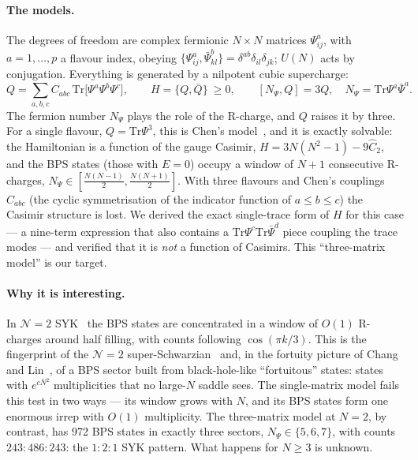 \documentclass[10pt]{article}
\newcommand{\Tr}{\mathrm{Tr}}
\newcommand{\bPsi}{\bar\Psi}
\newcommand{\bQ}{\bar Q}
\begin{document}
\paragraph{The models.}
The degrees of freedom are complex fermionic $N\times N$ matrices $\Psi^a_{ij}$, with $a=1,\dots,p$ a flavour index, obeying $\{\Psi^a_{ij},\bPsi^b_{kl}\}=\delta^{ab}\delta_{il}\delta_{jk}$; $U(N)$ acts by conjugation. Everything is generated by a nilpotent cubic supercharge:
\begin{equation}
Q=\sum_{a,b,c}C_{abc}\,\Tr\!\big[\Psi^a\Psi^b\Psi^c\big],\qquad H=\{Q,\bQ\}\ \ge0,\qquad [N_\Psi,Q]=3Q,\quad N_\Psi=\Tr\Psi^a\bPsi^a .
\end{equation}
The fermion number $N_\Psi$ plays the role of the R-charge, and $Q$ raises it by three. For a single flavour, $Q=\Tr\Psi^3$, this is Chen's model~\cite{Chen:2025fortuity}, and it is exactly solvable: the Hamiltonian is a function of the gauge Casimir, $H=3N(N^2-1)-9\hat C_2$, and the BPS states (those with $E=0$) occupy a window of $N+1$ consecutive R-charges, $N_\Psi\in[\tfrac{N(N-1)}2,\tfrac{N(N+1)}2]$. With three flavours and Chen's couplings $C_{abc}$ (the cyclic symmetrisation of the indicator function of $a\le b\le c$) the Casimir structure is lost. We derived the exact single-trace form of $H$ for this case --- a nine-term expression that also contains a $\Tr\Psi^c\Tr\bPsi^d$ piece coupling the trace modes --- and verified that it is \emph{not} a function of Casimirs. This ``three-matrix model'' is our target.

\paragraph{Why it is interesting.}
In $\mathcal N=2$ SYK~\cite{Fu:2016SUSYSYK} the BPS states are concentrated in a window of $O(1)$ R-charges around half filling, with counts following $\cos(\pi k/3)$. This is the fingerprint of the $\mathcal N=2$ super-Schwarzian~\cite{Turiaci:2023N2JT} and, in the fortuity picture of Chang and Lin~\cite{Chang:2024covering,Chang:2024fortuitySYK}, of a BPS sector built from black-hole-like ``fortuitous'' states: states with $e^{cN^2}$ multiplicities that no large-$N$ saddle sees. The single-matrix model fails this test in two ways --- its window grows with $N$, and its BPS states form one enormous irrep with $O(1)$ multiplicity. The three-matrix model at $N=2$, by contrast, has 972 BPS states in exactly three sectors, $N_\Psi\in\{5,6,7\}$, with counts $243{:}486{:}243$: the $1{:}2{:}1$ SYK pattern. What happens for $N\ge3$ is unknown.
\end{document}
